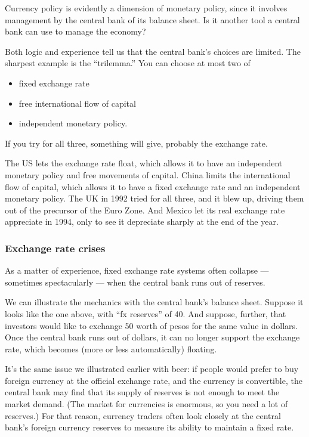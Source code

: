 \documentclass[letterpaper,12pt]{article}
\begin{document}
Currency policy is evidently a dimension of monetary policy,
since it involves management by the central bank of its balance sheet.
Is it another tool a central bank can use to manage the economy?

Both logic and experience tell us that the central bank's choices are limited.
The sharpest example is the ``trilemma.''
You can choose at most two of
\begin{itemize}
\item fixed exchange rate
\item free international flow of capital
\item independent monetary policy.
\end{itemize}
If you try for all three, something will give, probably the exchange rate.

The US lets the exchange rate float, which allows it to have an independent
monetary policy and free movements of capital.
China limits the international flow of capital,
which allows it to have a fixed exchange rate and an independent monetary policy.
The UK in 1992 tried for all three, and it blew up, driving them out
of the precursor of the Euro Zone.
And Mexico let its real exchange rate appreciate in 1994,
only to see it depreciate sharply at the end of the year.  


\subsubsection*{Exchange rate crises}

As a matter of experience, fixed exchange rate systems often collapse ---
sometimes spectacularly --- when the central bank runs out of reserves.

We can illustrate the mechanics with the central bank's balance sheet.
Suppose it looks like the one above, with ``fx reserves'' of 40.
And suppose, further, that investors
would like to exchange 50 worth of pesos for the same value in dollars.
Once the central bank runs out of dollars, it can no longer support
the exchange rate, which becomes (more or less automatically) floating.

It's the same issue we illustrated earlier with beer:
if people would prefer to buy foreign currency at the official
exchange rate,
and the currency is convertible,
the central bank may find that its supply of reserves is not
enough to meet the market demand.
(The market for currencies is enormous, so you need a lot of reserves.)
For that reason, currency traders often look closely at the central bank's
foreign currency reserves to measure its ability to maintain a fixed rate.
\end{document}
